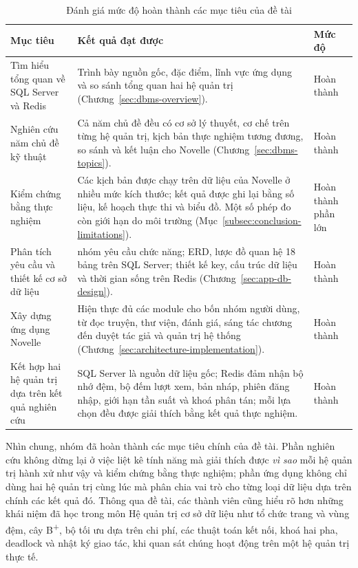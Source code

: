 \begin{table}[H]
\centering
\small
\renewcommand{\arraystretch}{1.3}
\begin{tabularx}{\textwidth}{|>{\raggedright\arraybackslash}p{4.2cm}|>{\raggedright\arraybackslash}X|>{\centering\arraybackslash}p{2.2cm}|}
\hline
\textbf{Mục tiêu} & \textbf{Kết quả đạt được} & \textbf{Mức độ} \\ \hline
Tìm hiểu tổng quan về SQL Server và Redis & Trình bày nguồn gốc, đặc điểm, lĩnh vực ứng dụng và so sánh tổng quan hai hệ quản trị (Chương~\ref{sec:dbms-overview}). & Hoàn thành \\ \hline
Nghiên cứu năm chủ đề kỹ thuật & Cả năm chủ đề đều có cơ sở lý thuyết, cơ chế trên từng hệ quản trị, kịch bản thực nghiệm tương đương, so sánh và kết luận cho Novelle (Chương~\ref{sec:dbms-topics}). & Hoàn thành \\ \hline
Kiểm chứng bằng thực nghiệm & Các kịch bản được chạy trên dữ liệu của Novelle ở nhiều mức kích thước; kết quả được ghi lại bằng số liệu, kế hoạch thực thi và biểu đồ. Một số phép đo còn giới hạn do môi trường (Mục~\ref{subsec:conclusion-limitations}). & Hoàn thành phần lớn \\ \hline
Phân tích yêu cầu và thiết kế cơ sở dữ liệu & 13 nhóm yêu cầu chức năng; ERD, lược đồ quan hệ 18 bảng trên SQL Server; thiết kế key, cấu trúc dữ liệu và thời gian sống trên Redis (Chương~\ref{sec:app-db-design}). & Hoàn thành \\ \hline
Xây dựng ứng dụng Novelle & Hiện thực đủ các module cho bốn nhóm người dùng, từ đọc truyện, thư viện, đánh giá, sáng tác chương đến duyệt tác giả và quản trị hệ thống (Chương~\ref{sec:architecture-implementation}). & Hoàn thành \\ \hline
Kết hợp hai hệ quản trị dựa trên kết quả nghiên cứu & SQL Server là nguồn dữ liệu gốc; Redis đảm nhận bộ nhớ đệm, bộ đếm lượt xem, bản nháp, phiên đăng nhập, giới hạn tần suất và khoá phân tán; mỗi lựa chọn đều được giải thích bằng kết quả thực nghiệm. & Hoàn thành \\ \hline
\end{tabularx}
\caption{Đánh giá mức độ hoàn thành các mục tiêu của đề tài}
\label{tab:conclusion-completion}
\end{table}

Nhìn chung, nhóm đã hoàn thành các mục tiêu chính của đề tài. Phần nghiên cứu không dừng lại ở việc liệt kê tính năng mà giải thích được \emph{vì sao} mỗi hệ quản trị hành xử như vậy và kiểm chứng bằng thực nghiệm; phần ứng dụng không chỉ dùng hai hệ quản trị cùng lúc mà phân chia vai trò cho từng loại dữ liệu dựa trên chính các kết quả đó. Thông qua đề tài, các thành viên cũng hiểu rõ hơn những khái niệm đã học trong môn Hệ quản trị cơ sở dữ liệu như tổ chức trang và vùng đệm, cây B\textsuperscript{+}, bộ tối ưu dựa trên chi phí, các thuật toán kết nối, khoá hai pha, deadlock và nhật ký giao tác, khi quan sát chúng hoạt động trên một hệ quản trị thực tế.

